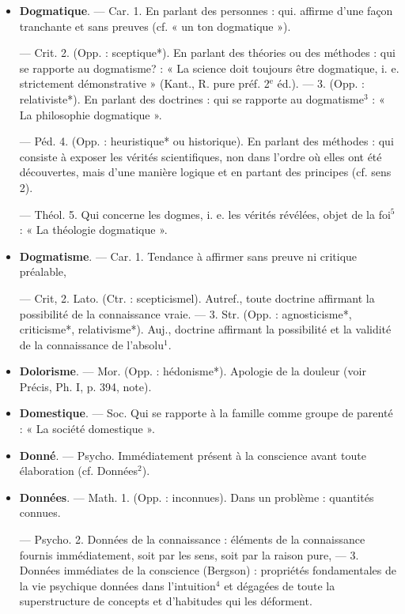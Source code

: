 \begin{itemize}[leftmargin=1cm, label=, itemsep=1pt]
\item {\bf Dogmatique}. — Car. 1. En parlant
des personnes : qui. affirme d’une
façon tranchante et sans preuves
(cf. « un ton dogmatique »).

— Crit. 2. (Opp. : sceptique*). En
parlant des théories ou des méthodes : qui se rapporte au dogmatisme? : « La science doit toujours
être dogmatique, i. e. strictement
démonstrative » (Kant., R. pure
préf. 2$^\text{e}$ éd.). — 3. (Opp. : relativiste*). En parlant des doctrines :
qui se rapporte au dogmatisme$^3$ :
« La philosophie dogmatique ».

— Péd. 4. (Opp. : heuristique* ou
historique). En parlant des méthodes : qui consiste à exposer les vérités scientifiques, non dans l’ordre
où elles ont été découvertes, mais
d'une manière logique et en partant des principes (cf. sens 2).

— Théol. 5. Qui concerne les
dogmes, i. e. les vérités révélées,
objet de la foi$^5$ : « La théologie dogmatique ».

\item {\bf Dogmatisme}. — Car. 1. Tendance à
affirmer sans preuve ni critique
préalable,

— Crit, 2. Lato. (Ctr. : scepticismel). Autref., toute doctrine affirmant la possibilité de la connaissance vraie. — 3. Str. (Opp. : agnosticisme*, criticisme*, relativisme*).
Auj., doctrine affirmant la possibilité et la validité de la connaissance
de l’absolu$^1$.

\item {\bf Dolorisme}. — Mor. (Opp. : hédonisme*).
Apologie de la douleur (voir Précis,
Ph. I, p. 394, note).

\item {\bf Domestique}. — Soc. Qui se rapporte à
la famille comme groupe de parenté :
« La société domestique ».

\item {\bf Donné}. — Psycho. Immédiatement
présent à la conscience avant toute
élaboration (cf. Données$^2$).

\item {\bf Données}. — Math. 1. (Opp. : inconnues). Dans un problème : quantités
connues.

— Psycho. 2. Données de la connaissance : éléments de la connaissance fournis immédiatement, soit
par les sens, soit par la raison pure,
— 3. Données immédiates de la conscience (Bergson) : propriétés fondamentales de la vie psychique données dans l'intuition$^4$ et dégagées de
toute la superstructure de concepts
et d’habitudes qui les déforment.


\end{itemize}
